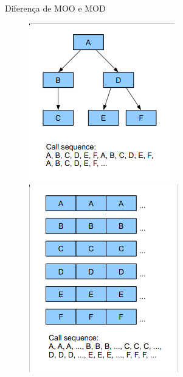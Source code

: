 \documentclass{beamer}
\begin{document}
\begin{frame}[t]{Diferença de MOO e MOD}
    \begin{figure}
    \centering
        \begin{minipage}[b]{0.35\textwidth}
            \includegraphics[width=\textwidth]{figuras/objectreadingorder}
        \end{minipage}
        \begin{minipage}[b]{0.35\textwidth}
            \includegraphics[width=\textwidth]{figuras/dodreadingorder}

\end{minipage}
\end{figure}
\end{frame}
\end{document}
